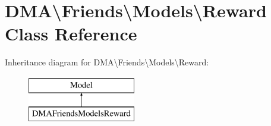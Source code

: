 \hypertarget{classDMA_1_1Friends_1_1Models_1_1Reward}{}\section{D\+M\+A\textbackslash{}Friends\textbackslash{}Models\textbackslash{}Reward Class Reference}
\label{classDMA_1_1Friends_1_1Models_1_1Reward}
Inheritance diagram for D\+M\+A\textbackslash{}Friends\textbackslash{}Models\textbackslash{}Reward\+:\begin{figure}[H]
\begin{center}
\leavevmode
\includegraphics[height=2.000000cm]{d7/dc4/classDMA_1_1Friends_1_1Models_1_1Reward}
\end{center}
\end{figure}
